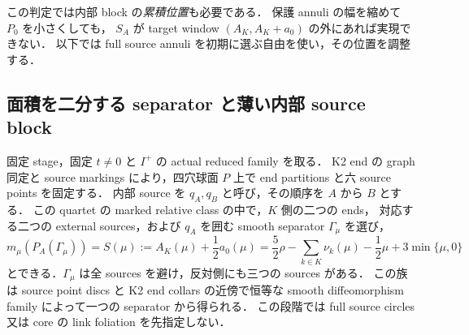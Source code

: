 この判定では内部 block の\emph{累積位置}も必要である．
保護 annuli の幅を縮めて $P_0$ を小さくしても，
$S_A$ が target window $(A_K,A_K+a_0)$ の外にあれば実現できない．
以下では full source annuli を初期に選ぶ自由を使い，その位置を調整する．

\subsection{面積を二分する separator と薄い内部 source block}

\begin{lemma}
\label{ke:petersen-balanced-separator}
固定 stage，固定 $t\ne0$ と $I^+$ の actual reduced family を取る．
K2 end の graph 同定と source markings により，四穴球面 $P$ 上で
end partitions と六 source points を固定する．
内部 source を $q_A,q_B$ と呼び，その順序を $A$ から $B$ とする．
この quartet の marked relative class の中で，$K$ 側の二つの ends，
対応する二つの external sources，および $q_A$ を囲む smooth separator
$\Gamma_\mu$ を選び，
\begin{equation}\label{ke:eq:petersen-balanced-area}
 m_\mu(P_A(\Gamma_\mu))
 =S(\mu):=A_K(\mu)+\frac12a_0(\mu)
 =\frac52\rho-\sum_{k\in K}\nu_k(\mu)
       -\frac12\mu+3\min\{\mu,0\}
\end{equation}
とできる．$\Gamma_\mu$ は全 sources を避け，反対側にも三つの sources がある．
この族は source point discs と K2 end collars の近傍で恒等な
smooth diffeomorphism family によって一つの separator から得られる．
この段階では full source circles 又は core の link foliation を先指定しない．
\end{lemma}

